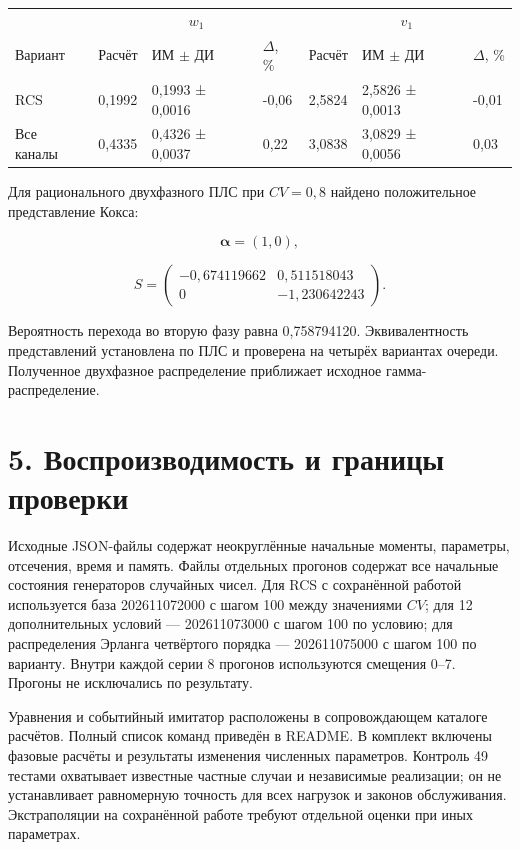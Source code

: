 \setlength{\tabcolsep}{2pt}
\begin{tabular}{p{4.16cm}p{1.61cm}p{2.83cm}p{1.28cm}p{1.61cm}p{2.83cm}p{1.28cm}}
\toprule
 & \multicolumn{3}{c}{$w_1$} & \multicolumn{3}{c}{$v_1$} \\
Вариант & Расчёт & ИМ $\pm$ ДИ & $\Delta$, \% & Расчёт & ИМ $\pm$ ДИ & $\Delta$, \% \\
\midrule
RCS & 0,1992 & 0,1993 ± 0,0016 & -0,06 & 2,5824 & 2,5826 ± 0,0013 & -0,01 \\
Все каналы & 0,4335 & 0,4326 ± 0,0037 & 0,22 & 3,0838 & 3,0829 ± 0,0056 & 0,03 \\
\bottomrule
\end{tabular}




Для рационального двухфазного ПЛС при \(CV=0{,}8\) найдено положительное представление Кокса:


\[\boldsymbol\alpha=(1,0),\]

\[S=\begin{pmatrix}-0{,}674119662&0{,}511518043\\0&-1{,}230642243\end{pmatrix}.\]


Вероятность перехода во вторую фазу равна 0{,}758794120. Эквивалентность представлений установлена по ПЛС и проверена на четырёх вариантах очереди. Полученное двухфазное распределение приближает исходное гамма-распределение.

\section*{5. Воспроизводимость и границы проверки}
Исходные JSON-файлы содержат неокруглённые начальные моменты, параметры, отсечения, время и память. Файлы отдельных прогонов содержат все начальные состояния генераторов случайных чисел. Для RCS с сохранённой работой используется база 202611072000 с шагом 100 между значениями \(CV\); для 12 дополнительных условий --- 202611073000 с шагом 100 по условию; для распределения Эрланга четвёртого порядка --- 202611075000 с шагом 100 по варианту. Внутри каждой серии 8 прогонов используются смещения 0--7. Прогоны не исключались по результату.

Уравнения и событийный имитатор расположены в сопровождающем каталоге расчётов. Полный список команд приведён в README. В комплект включены фазовые расчёты и результаты изменения численных параметров. Контроль 49 тестами охватывает известные частные случаи и независимые реализации; он не устанавливает равномерную точность для всех нагрузок и законов обслуживания. Экстраполяции на сохранённой работе требуют отдельной оценки при иных параметрах.

